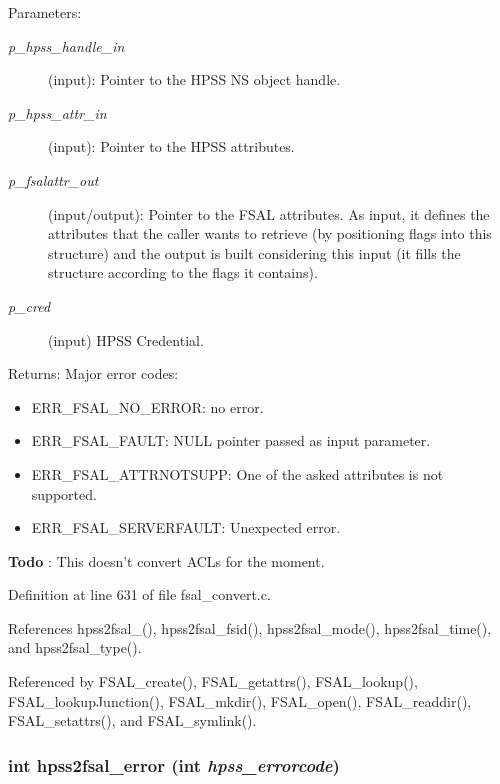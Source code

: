 \begin{Desc}
\item[Parameters:]
\begin{description}
\item[{\em p\_\-hpss\_\-handle\_\-in}](input): Pointer to the HPSS NS object handle. \item[{\em p\_\-hpss\_\-attr\_\-in}](input): Pointer to the HPSS attributes. \item[{\em p\_\-fsalattr\_\-out}](input/output): Pointer to the FSAL attributes. As input, it defines the attributes that the caller wants to retrieve (by positioning flags into this structure) and the output is built considering this input (it fills the structure according to the flags it contains). \item[{\em p\_\-cred}](input) HPSS Credential.\end{description}
\end{Desc}
\begin{Desc}
\item[Returns:]Major error codes:\begin{itemize}
\item ERR\_\-FSAL\_\-NO\_\-ERROR: no error.\item ERR\_\-FSAL\_\-FAULT: NULL pointer passed as input parameter.\item ERR\_\-FSAL\_\-ATTRNOTSUPP: One of the asked attributes is not supported.\item ERR\_\-FSAL\_\-SERVERFAULT: Unexpected error. \end{itemize}
\end{Desc}


\begin{Desc}
\item[{\bf Todo}]: This doesn't convert ACLs for the moment. \end{Desc}


Definition at line 631 of file fsal\_\-convert.c.

References hpss2fsal\_(), hpss2fsal\_\-fsid(), hpss2fsal\_\-mode(), hpss2fsal\_\-time(), and hpss2fsal\_\-type().

Referenced by FSAL\_\-create(), FSAL\_\-getattrs(), FSAL\_\-lookup(), FSAL\_\-lookupJunction(), FSAL\_\-mkdir(), FSAL\_\-open(), FSAL\_\-readdir(), FSAL\_\-setattrs(), and FSAL\_\-symlink().
\subsubsection[{hpss2fsal\_\-error}]{\setlength{\rightskip}{0pt plus 5cm}int hpss2fsal\_\-error (int {\em hpss\_\-errorcode})}\label{fsal__convert_8c_6348179c6dd9f68021108a1e7b1b53bc}


